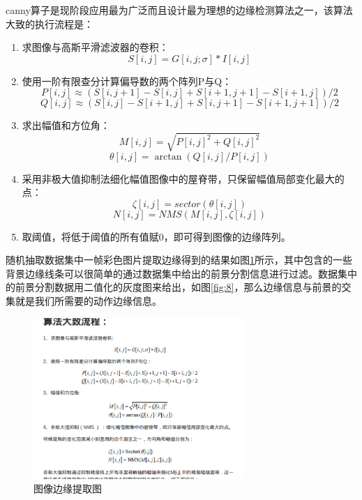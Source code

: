 \documentclass[a4paper, 12pt]{article}
\begin{document}
canny算子是现阶段应用最为广泛而且设计最为理想的边缘检测算法之一\cite{p6}，该算法大致的执行流程是：
\begin{enumerate}
\item 求图像与高斯平滑滤波器的卷积：
\begin{equation}
  S[i,j] = G[i,j;\sigma]*I[i,j]
\end{equation}
\item 使用一阶有限查分计算偏导数的两个阵列P与Q：
\begin{equation}
  P[i,j]\approx (S[i,j+1]-S[i,j]+S[i+1,j+1]-S[i+1,j])/2
\end{equation}
\begin{equation}
  Q[i,j]\approx (S[i,j]-S[i+1,j]+S[i,j+1]-S[i+1,j+1])/2
\end{equation}
\item 求出幅值和方位角：
\begin{equation}
  M[i,j] = \sqrt{P[i,j]^2+Q[i,j]^2}
\end{equation}
\begin{equation}
  \theta[i,j] = \arctan(Q[i,j]/P[i,j])
\end{equation}
\item 采用非极大值抑制法细化幅值图像中的屋脊带，只保留幅值局部变化最大的点：
\begin{equation}
  \zeta[i,j] = sector(\theta[i,j])
\end{equation}
\begin{equation}
  N[i,j] = NMS(M[i,j],\zeta[i,j])
\end{equation}
\item 取阈值，将低于阈值的所有值赋0，即可得到图像的边缘阵列。
\end{enumerate}

随机抽取数据集中一帧彩色图片提取边缘得到的结果如图\ref{fig:6}所示，其中包含的一些背景边缘线条可以很简单的通过数据集中给出的前景分割信息进行过滤。数据集中的前景分割数据用二值化的灰度图来给出，如图\ref{fig:8}，那么边缘信息与前景的交集就是我们所需要的动作边缘信息。
\begin{figure}[ht]
  \centering
  \label{fig:6}
  \includegraphics[width=8cm]{canny.png}
  \caption{图像边缘提取图\label{fig:6}}
\end{figure}
\end{document}
